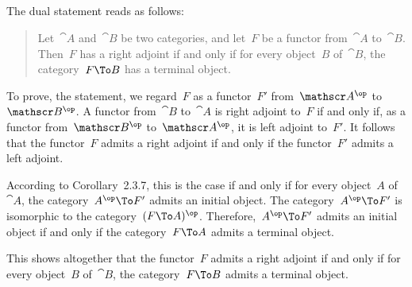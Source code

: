 \subsection{}

The dual statement reads as follows:
\begin{quote}
	Let~$\cat{A}$ and~$\cat{B}$ be two categories, and let~$F$ be a functor from~$\cat{A}$ to~$\cat{B}$.
	Then~$F$ has a right adjoint if and only if for every object~$B$ of~$\cat{B}$, the category~$F \To B$ has a terminal object.
\end{quote}

To prove, the statement, we regard~$F$ as a functor~$F'$ from~$\cat{A}^{\op}$ to~$\cat{B}^{\op}$.
A functor from~$\cat{B}$ to~$\cat{A}$ is right adjoint to~$F$ if and only if, as a functor from~$\cat{B}^{\op}$ to~$\cat{A}^{\op}$, it is left adjoint to~$F'$.
It follows that the functor~$F$ admits a right adjoint if and only if the functor~$F'$ admits a left adjoint.

According to Corollary~2.3.7, this is the case if and only if for every object~$A$ of~$\cat{A}$, the category~$A^{\op} \To F'$ admits an initial object.
The category~$A^{\op} \To F'$ is isomorphic to the category~$(F \To A)^{\op}$.
Therefore,~$A^{\op} \To F'$ admits an initial object if and only if the category~$F \To A$ admits a terminal object.

This shows altogether that the functor~$F$ admits a right adjoint if and only if for every object~$B$ of~$\cat{B}$, the category~$F \To B$ admits a terminal object.
